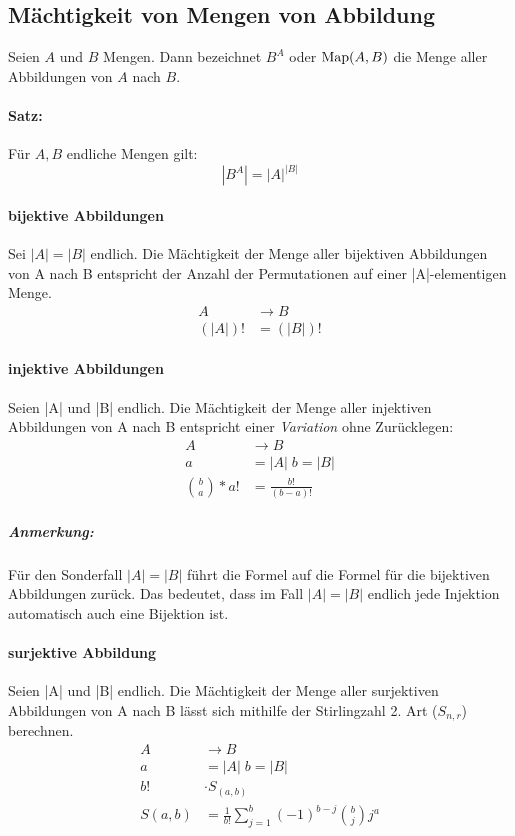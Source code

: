 \subsection{Mächtigkeit von Mengen von Abbildung}
Seien $A$ und $B$ Mengen.
Dann bezeichnet $B^A$ oder $\text{Map}(A,B)$ die Menge aller Abbildungen von $A$
nach $B$. \paragraph*{Satz:}
Für $A, B$ endliche Mengen gilt:
$$ |B^A| = {|A|}^{|B|} $$

\paragraph*{bijektive Abbildungen}
Sei $|A|=|B|$ endlich. Die Mächtigkeit der Menge aller bijektiven
Abbildungen von A nach B entspricht der Anzahl der Permutationen auf
einer |A|-elementigen Menge.
\begin{align*}
  A &\rightarrow B \\
  (|A|)! &= (|B|)!
\end{align*}

\paragraph*{injektive Abbildungen}
Seien |A| und |B| endlich. Die Mächtigkeit der Menge aller injektiven
Abbildungen von A nach B entspricht einer \emph{Variation} ohne Zurücklegen:
\begin{align*}
  A &\rightarrow B \\
  a &= |A| \; b = |B| \\
  {{b}\choose{a}} * a!
  &= \frac{b!}{(b-a)!}
\end{align*}

\subparagraph*{Anmerkung:} Für den Sonderfall $|A|=|B|$ führt die Formel auf die Formel für die bijektiven Abbildungen zurück. Das bedeutet, dass im Fall $|A|=|B|$ endlich jede Injektion
automatisch auch eine Bijektion ist.

\paragraph*{surjektive Abbildung}
Seien |A| und |B| endlich. Die Mächtigkeit der Menge aller surjektiven
Abbildungen von A nach B lässt sich mithilfe der
Stirlingzahl 2. Art ($S_{n,r}$) berechnen.
\begin{align*}
  A &\rightarrow B \\
  a &= |A| \; b = |B| \\
  b!    &\cdot S_{(a,b)}\\
  S(a,b)&=\frac{1}{b!}\sum_{j=1}^{b}(-1)^{b-j}{b \choose j}j^a
\end{align*}